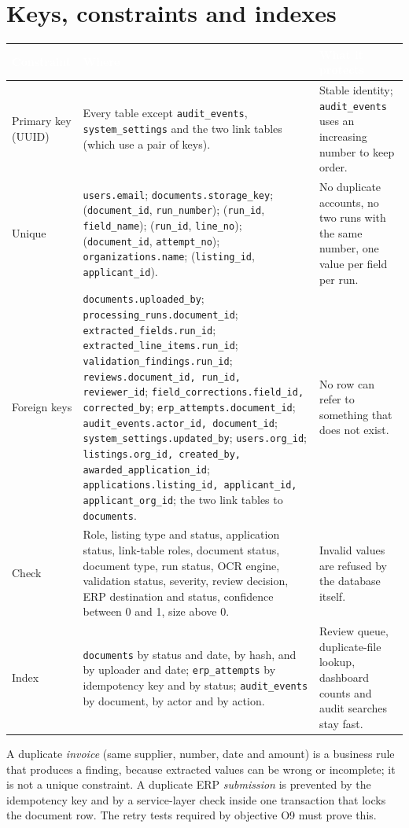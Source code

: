 \documentclass[11pt,a4paper]{report}
\newcommand{\hdr}[1]{\textcolor{white}{\sffamily\bfseries #1}}
\newcommand{\tblstart}{\rowcolors{2}{white}{rowgray}\arrayrulecolor{teal!60}}
\newcommand{\hdrrow}{\rowcolor{navy}}
\begin{document}
\section{Keys, constraints and indexes}\label{sec:p2fk}
{\tblstart\small
\begin{longtable}{L{4.4cm}L{4.4cm}L{5.0cm}}
\hdrrow \hdr{Constraint} & \hdr{Where} & \hdr{What it protects}\\ \endhead
Primary key (UUID) & Every table except \texttt{audit\_events}, \texttt{system\_settings} and the two link tables (which use a pair of keys). & Stable identity; \texttt{audit\_events} uses an increasing number to keep order.\\
Unique & \texttt{users.email}; \texttt{documents.storage\_key}; (\texttt{document\_id}, \texttt{run\_number}); (\texttt{run\_id}, \texttt{field\_name}); (\texttt{run\_id}, \texttt{line\_no}); (\texttt{document\_id}, \texttt{attempt\_no}); \texttt{organizations.name}; (\texttt{listing\_id}, \texttt{applicant\_id}). & No duplicate accounts, no two runs with the same number, one value per field per run.\\
Foreign keys & \texttt{documents.uploaded\_by}; \texttt{processing\_runs.document\_id}; \texttt{extracted\_fields.run\_id}; \texttt{extracted\_line\_items.run\_id}; \texttt{validation\_findings.run\_id}; \texttt{reviews.document\_id, run\_id, reviewer\_id}; \texttt{field\_corrections.field\_id, corrected\_by}; \texttt{erp\_attempts.document\_id}; \texttt{audit\_events.actor\_id, document\_id}; \texttt{system\_settings.updated\_by}; \texttt{users.org\_id}; \texttt{listings.org\_id, created\_by, awarded\_application\_id}; \texttt{applications.listing\_id, applicant\_id, applicant\_org\_id}; the two link tables to \texttt{documents}. & No row can refer to something that does not exist.\\
Check & Role, listing type and status, application status, link-table roles, document status, document type, run status, OCR engine, validation status, severity, review decision, ERP destination and status, confidence between 0 and 1, size above 0. & Invalid values are refused by the database itself.\\
Index & \texttt{documents} by status and date, by hash, and by uploader and date; \texttt{erp\_attempts} by idempotency key and by status; \texttt{audit\_events} by document, by actor and by action. & Review queue, duplicate-file lookup, dashboard counts and audit searches stay fast.\\
\hline
\end{longtable}}
\begin{infobox}
A duplicate \emph{invoice} (same supplier, number, date and amount) is a business rule that produces a finding, because extracted values can be wrong or incomplete; it is not a unique constraint. A duplicate ERP \emph{submission} is prevented by the idempotency key and by a service-layer check inside one transaction that locks the document row. The retry tests required by objective O9 must prove this.
\end{infobox}
\end{document}
